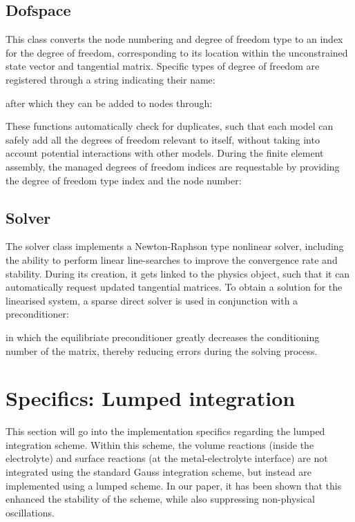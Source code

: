 \documentclass[3p]{elsarticle} %
\begin{document}
\subsection{Dofspace}
This class converts the node numbering and degree of freedom type to an index for the degree of freedom, corresponding to its location within the unconstrained state vector and tangential matrix. Specific types of degree of freedom are registered through a string indicating their name:

after which they can be added to nodes through:

These functions automatically check for duplicates, such that each model can safely add all the degrees of freedom relevant to itself, without taking into account potential interactions with other models. During the finite element assembly, the managed degrees of freedom indices are requestable by providing the degree of freedom type index and the node number:


\subsection{Solver}
The solver class implements a Newton-Raphson type nonlinear solver, including the ability to perform linear line-searches to improve the convergence rate and stability. During its creation, it gets linked to the physics object, such that it can automatically request updated tangential matrices. To obtain a solution for the linearised system, a sparse direct solver is used in conjunction with a preconditioner:

in which the equilibriate preconditioner greatly decreases the conditioning number of the matrix, thereby reducing errors during the solving process. 

\section{Specifics: Lumped integration}
\label{sec:LumpedScheme}
This section will go into the implementation specifics regarding the lumped integration scheme. Within this scheme, the volume reactions (inside the electrolyte) and surface reactions (at the metal-electrolyte interface) are not integrated using the standard Gauss integration scheme, but instead are implemented using a lumped scheme. In our paper, it has been shown that this enhanced the stability of the scheme, while also suppressing non-physical oscillations. 
\end{document}
